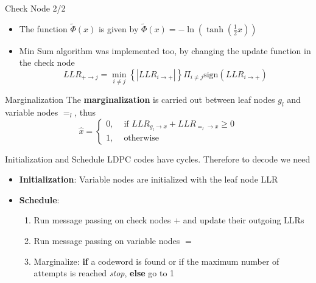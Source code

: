 \documentclass[pdf]
          {beamer}
\newlength\fheight
\newlength\fwidth
\begin{document}
\begin{frame}{Check Node 2/2}
	\begin{itemize}
		\item The function $\tilde{\Phi} (x) $ is given by
				$
					\tilde{\Phi}(x) = - \ln \left( \tanh \left(\frac{1}{2} x\right)\right)
				$
				\begin{figure}[t]
					\centering
					\setlength{}
					\setlength{}
					
					\label{fig:info_uni}
				\end{figure}
		\item Min Sum algorithm was implemented too, by changing the update function in the check node
			$$
				LLR_{+\rightarrow j} = \min_{i \ne j} \left\{ |LLR_{i \rightarrow +}| \right\} \Pi_{i \ne j} \mbox{sign} \left( LLR_{i \rightarrow +} \right)
			$$
	\end{itemize}

\end{frame}

\begin{frame}{Marginalization}
	The \textbf{marginalization} is carried out between leaf nodes $g_l$ and variable nodes $=_l$, thus
	$$
		\hat{x} =
		\begin{cases}
			0, &\text{ if }LLR_{g_l \rightarrow x} + LLR_{=_l \rightarrow x} \ge 0\\
			1, &\text{ otherwise }
		\end{cases}
	$$
\end{frame}

\begin{frame}{Initialization and Schedule}
	LDPC codes have cycles. Therefore to decode we need
	\begin{itemize}
		\item \textbf{Initialization}: Variable nodes are initialized with the leaf node LLR
		\item \textbf{Schedule}: 
		\begin{enumerate}
			\item Run message passing on check nodes $+$ and update their outgoing LLRs
			\item Run message passing on variable nodes $=$
			\item Marginalize: \textbf{if} a codeword is found or if the maximum number of attempts is reached \textit{stop}, \textbf{else} go to 1
		\end{enumerate}
	\end{itemize}
\end{frame}
\end{document}
